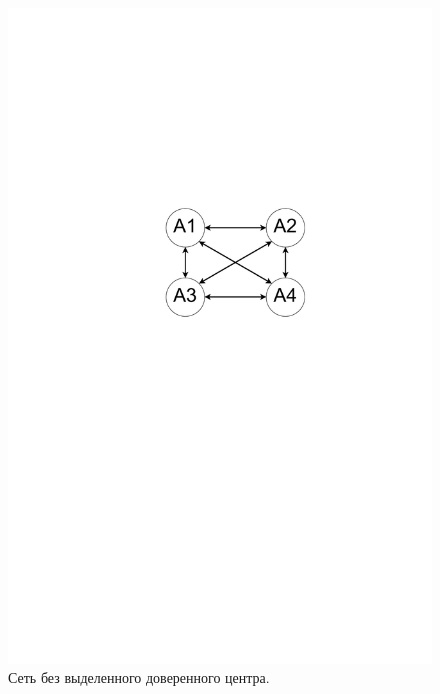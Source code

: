 \documentclass[a4paper]{article}
\begin{document}
\begin{figure}[H]
	\begin{center}
	\begin{minipage}[h]{0.45\linewidth}
	\includegraphics[width=1\linewidth]{pic1.pdf}
	\caption{Сеть без выделенного доверенного центра.} 
    \label{p2}
	\end{minipage}
	\hfill 
	\begin{minipage}[h]{0.43\linewidth}

\end{minipage}
\end{center}
\end{figure}
\end{document}

